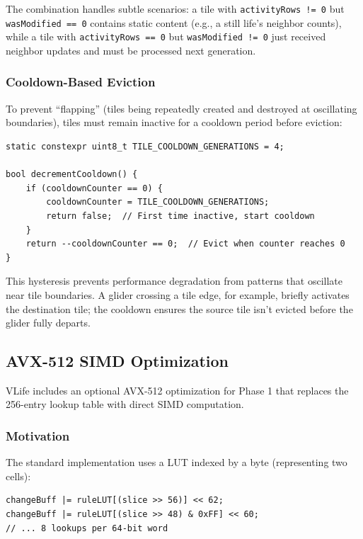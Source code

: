 \documentclass[11pt]{article}
\theoremstyle{definition}
\begin{document}
    The combination handles subtle scenarios: a tile with \texttt{activityRows != 0} but \texttt{wasModified == 0} contains static content (e.g., a still life's neighbor counts), while a tile with \texttt{activityRows == 0} but \texttt{wasModified != 0} just received neighbor updates and must be processed next generation.

    \subsubsection{Cooldown-Based Eviction}

    To prevent ``flapping'' (tiles being repeatedly created and destroyed at oscillating boundaries), tiles must remain inactive for a cooldown period before eviction:

    \begin{lstlisting}
static constexpr uint8_t TILE_COOLDOWN_GENERATIONS = 4;

bool decrementCooldown() {
    if (cooldownCounter == 0) {
        cooldownCounter = TILE_COOLDOWN_GENERATIONS;
        return false;  // First time inactive, start cooldown
    }
    return --cooldownCounter == 0;  // Evict when counter reaches 0
}
    \end{lstlisting}

    This hysteresis prevents performance degradation from patterns that oscillate near tile boundaries. A glider crossing a tile edge, for example, briefly activates the destination tile; the cooldown ensures the source tile isn't evicted before the glider fully departs.

    \subsection{AVX-512 SIMD Optimization}

    VLife includes an optional AVX-512 optimization for Phase 1 that replaces the 256-entry lookup table with direct SIMD computation.

    \subsubsection{Motivation}

    The standard implementation uses a LUT indexed by a byte (representing two cells):

    \begin{lstlisting}
changeBuff |= ruleLUT[(slice >> 56)] << 62;
changeBuff |= ruleLUT[(slice >> 48) & 0xFF] << 60;
// ... 8 lookups per 64-bit word
    \end{lstlisting}
\end{document}
